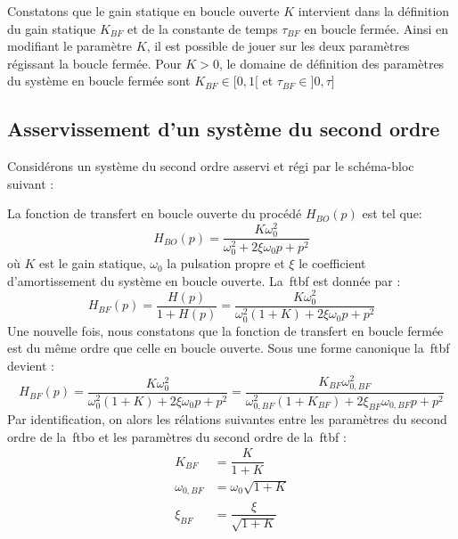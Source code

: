Constatons que le gain statique en boucle ouverte $K$ intervient 
dans la définition du gain statique $K_{BF}$ et de la constante de temps 
$\tau_{BF}$ en boucle fermée. Ainsi en modifiant le paramètre $K$, il est 
possible de jouer sur les deux paramètres régissant la boucle fermée.
Pour $K>0$, le domaine de définition des paramètres du système en boucle 
fermée sont  $K_{BF}\in[0,1[$ et  $\tau_{BF}\in]0,\tau]$

\subsection{Asservissement d'un système du second ordre}

Considérons un système du second ordre asservi et régi par le schéma-bloc 
suivant :
\begin{center}
\end{center}
La fonction de transfert en boucle ouverte du procédé $H_{BO}(p)$ est tel que:
$$
H_{BO}(p)=\dfrac{K\omega^2_0}{\omega^2_0+2\xi\omega_0p+p^2}
$$
où $K$ est le gain statique, $\omega_0$ la pulsation propre et $\xi$ 
le coefficient d'amortissement du système en boucle ouverte.
La~\gls{ftbf} est donnée par :
$$
H_{BF}(p)=\dfrac{H(p)}{1+H(p)}=
\dfrac{K\omega^2_0}{\omega^2_0(1+K)+2\xi\omega_0p+p^2}
$$
Une nouvelle fois, nous constatons que la fonction de transfert en 
boucle fermée est du même ordre que celle en boucle ouverte. 
Sous une forme canonique la~\gls{ftbf} devient :
$$
H_{BF}(p)=\dfrac{K\omega^2_0}{\omega^2_0(1+K)+2\xi\omega_0p+p^2}=
\dfrac{K_{BF}\omega^2_{0,BF}}{\omega^2_{0,BF}(1+K_{BF})+
2\xi_{BF}\omega_{0,BF}p+p^2}
$$
Par identification, on alors les rélations suivantes entre 
les paramètres du second ordre de la~\gls{ftbo} et les paramètres du 
second ordre de la~\gls{ftbf} :
\begin{align*}
       K_{BF}&=\dfrac{K}{1+K}\\
    \omega_{0,BF}&=\omega_0\sqrt{1+K}\\
    \xi_{BF}&=\dfrac{\xi}{\sqrt{1+K}}
\end{align*}

